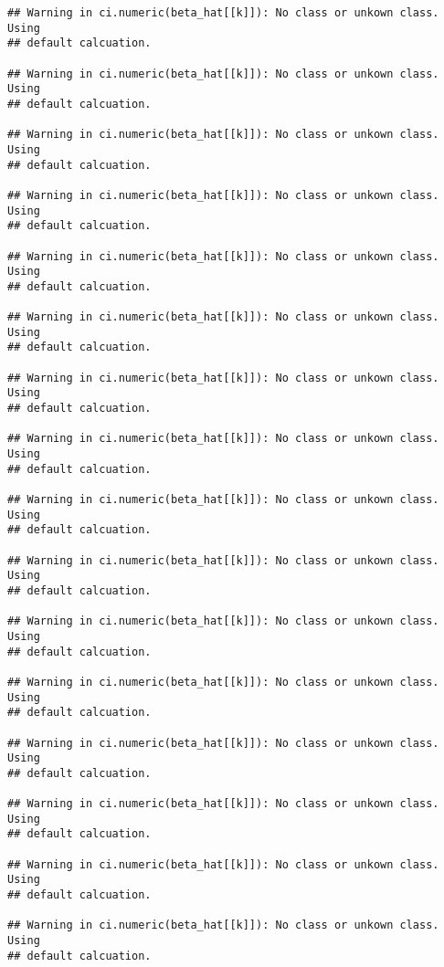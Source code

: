 \documentclass[]{article}
\newenvironment{Shaded}{\begin{snugshade}}{\end{snugshade}}
\newcommand{\KeywordTok}[1]{\textcolor[rgb]{0.13,0.29,0.53}{\textbf{{#1}}}}
\newcommand{\DecValTok}[1]{\textcolor[rgb]{0.00,0.00,0.81}{{#1}}}
\newcommand{\FloatTok}[1]{\textcolor[rgb]{0.00,0.00,0.81}{{#1}}}
\newcommand{\StringTok}[1]{\textcolor[rgb]{0.31,0.60,0.02}{{#1}}}
\newcommand{\NormalTok}[1]{{#1}}
\begin{document}
\begin{verbatim}
## Warning in ci.numeric(beta_hat[[k]]): No class or unkown class. Using
## default calcuation.

## Warning in ci.numeric(beta_hat[[k]]): No class or unkown class. Using
## default calcuation.

## Warning in ci.numeric(beta_hat[[k]]): No class or unkown class. Using
## default calcuation.

## Warning in ci.numeric(beta_hat[[k]]): No class or unkown class. Using
## default calcuation.

## Warning in ci.numeric(beta_hat[[k]]): No class or unkown class. Using
## default calcuation.

## Warning in ci.numeric(beta_hat[[k]]): No class or unkown class. Using
## default calcuation.

## Warning in ci.numeric(beta_hat[[k]]): No class or unkown class. Using
## default calcuation.

## Warning in ci.numeric(beta_hat[[k]]): No class or unkown class. Using
## default calcuation.

## Warning in ci.numeric(beta_hat[[k]]): No class or unkown class. Using
## default calcuation.

## Warning in ci.numeric(beta_hat[[k]]): No class or unkown class. Using
## default calcuation.

## Warning in ci.numeric(beta_hat[[k]]): No class or unkown class. Using
## default calcuation.

## Warning in ci.numeric(beta_hat[[k]]): No class or unkown class. Using
## default calcuation.

## Warning in ci.numeric(beta_hat[[k]]): No class or unkown class. Using
## default calcuation.

## Warning in ci.numeric(beta_hat[[k]]): No class or unkown class. Using
## default calcuation.

## Warning in ci.numeric(beta_hat[[k]]): No class or unkown class. Using
## default calcuation.

## Warning in ci.numeric(beta_hat[[k]]): No class or unkown class. Using
## default calcuation.
\end{verbatim}

\begin{Shaded}
\end{Shaded}
\end{document}
